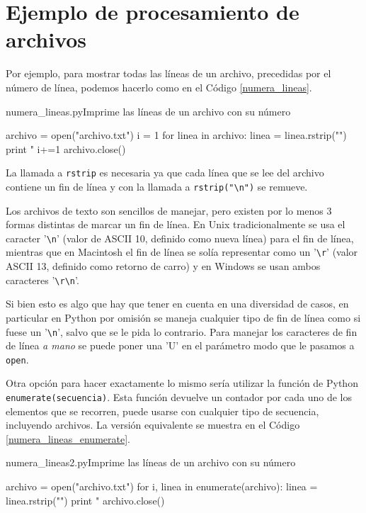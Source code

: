 \section{Ejemplo de procesamiento de archivos}

Por ejemplo, para mostrar todas las líneas de un archivo,
precedidas por el número de línea, podemos hacerlo como en el Código \ref{numera_lineas}.

\begin{codigo}{numera\_lineas.py}{Imprime las líneas de un archivo con su número}
\label{numera_lineas}
\begin{codigo-python}
archivo = open("archivo.txt")
i = 1
for linea in archivo:
    linea = linea.rstrip("\n")
    print "%
    i+=1
archivo.close()
\end{codigo-python}
\end{codigo}

La llamada a \lstinline!rstrip! es necesaria ya que cada línea que se lee del
archivo contiene un fin de línea y con la llamada a
\lstinline!rstrip("\n")! se remueve.

\begin{sabias_que}
Los archivos de texto son sencillos de manejar, pero existen por lo menos 3
formas distintas de marcar un fin de línea. En Unix tradicionalmente se usa
el caracter '\verb!\n!' (valor de ASCII 10, definido como nueva línea) para
el fin de línea, mientras que en Macintosh el fin de línea se solía
representar como un '\verb!\r!' (valor ASCII 13, definido como retorno de
carro) y en Windows se usan ambos caracteres '\verb!\r\n!'.

Si bien esto es algo que hay que tener en cuenta en una diversidad de
casos, en particular en Python por omisión se maneja cualquier tipo de fin
de línea como si fuese un '\verb!\n!', salvo que se le pida lo contrario.
Para manejar los caracteres de fin de línea \textit{a mano} se puede poner
una 'U' en el parámetro modo que le pasamos a \lstinline!open!.
\end{sabias_que}

Otra opción para hacer exactamente lo mismo sería utilizar la función de
Python \lstinline!enumerate(secuencia)!.  Esta función devuelve un contador
por cada uno de los elementos que se recorren, puede usarse con cualquier
tipo de secuencia, incluyendo archivos.  La versión equivalente se muestra
en el Código \ref{numera_lineas_enumerate}.

\begin{codigo}{numera\_lineas2.py}{Imprime las líneas de un archivo con su número}
\label{numera_lineas_enumerate}
\begin{codigo-python}
archivo = open("archivo.txt")
for i, linea in enumerate(archivo):
    linea = linea.rstrip("\n")
    print "%
archivo.close()
\end{codigo-python}
\end{codigo}

